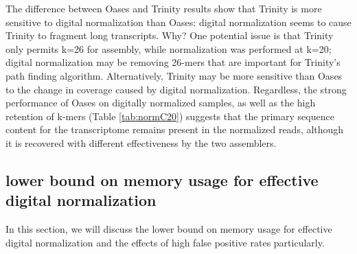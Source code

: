 % 
The difference between Oases and Trinity results show that Trinity is more
sensitive to digital normalization than Oases: digital normalization seems to
cause Trinity to fragment long transcripts. Why?  One potential issue is that
Trinity only permits k=26 for assembly, while normalization was performed at
k=20; digital normalization may be removing 26-mers that are important for
Trinity's path finding algorithm.  Alternatively, Trinity may be more sensitive
than Oases to the change in coverage caused by digital normalization.
Regardless, the strong performance of Oases on digitally normalized samples, as
well as the high retention of k-mers (Table \ref{tab:normC20}) suggests that
the primary sequence content for the transcriptome remains present in the
normalized reads, although it is recovered with different effectiveness by the
two assemblers.


\subsection{lower bound on memory usage for effective digital normalization}

In this section, we will discuss the lower bound on memory usage for effective digital
normalization and the effects of high false positive rates particularly.

